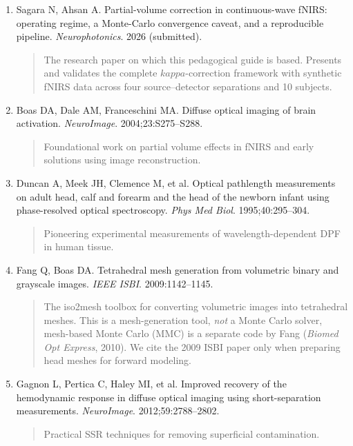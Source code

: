 \documentclass[12pt]{article}
\def\kappa{kappa}%
\begin{document}
\begin{enumerate}

\item Sagara N, Ahsan A. Partial-volume correction in continuous-wave fNIRS: operating regime, a Monte-Carlo convergence caveat, and a reproducible pipeline. \textit{Neurophotonics}. 2026 (submitted).
\begin{quote}
The research paper on which this pedagogical guide is based. Presents and validates the complete $\kappa$-correction framework with synthetic fNIRS data across four source--detector separations and 10 subjects.
\end{quote}

\item Boas DA, Dale AM, Franceschini MA. Diffuse optical imaging of brain activation. \textit{NeuroImage}. 2004;23:S275--S288.
\begin{quote}
Foundational work on partial volume effects in fNIRS and early solutions using image reconstruction.
\end{quote}

\item Duncan A, Meek JH, Clemence M, et al. Optical pathlength measurements on adult head, calf and forearm and the head of the newborn infant using phase-resolved optical spectroscopy. \textit{Phys Med Biol}. 1995;40:295--304.
\begin{quote}
Pioneering experimental measurements of wavelength-dependent DPF in human tissue.
\end{quote}

\item Fang Q, Boas DA. Tetrahedral mesh generation from volumetric binary and grayscale images. \textit{IEEE ISBI}. 2009:1142--1145.
\begin{quote}
The iso2mesh toolbox for converting volumetric images into tetrahedral meshes. This is a mesh-generation tool, \emph{not} a Monte Carlo solver, mesh-based Monte Carlo (MMC) is a separate code by Fang (\textit{Biomed Opt Express}, 2010). We cite the 2009 ISBI paper only when preparing head meshes for forward modeling.
\end{quote}

\item Gagnon L, Pertica C, Haley MI, et al. Improved recovery of the hemodynamic response in diffuse optical imaging using short-separation measurements. \textit{NeuroImage}. 2012;59:2788--2802.
\begin{quote}
Practical SSR techniques for removing superficial contamination.
\end{quote}


\end{enumerate}
\end{document}
